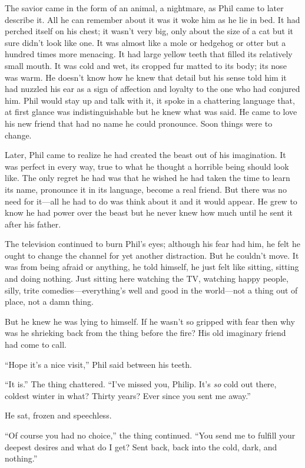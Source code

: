 \documentclass[
]{article}
\begin{document}
The savior came in the form of an animal, a nightmare, as Phil came to
later describe it. All he can remember about it was it woke him as he
lie in bed. It had perched itself on his chest; it wasn't very big, only
about the size of a cat but it sure didn't look like one. It was almost
like a mole or hedgehog or otter but a hundred times more menacing. It
had large yellow teeth that filled its relatively small mouth. It was
cold and wet, its cropped fur matted to its body; its nose was warm. He
doesn't know how he knew that detail but his sense told him it had
nuzzled his ear as a sign of affection and loyalty to the one who had
conjured him. Phil would stay up and talk with it, it spoke in a
chattering language that, at first glance was indistinguishable but he
knew what was said. He came to love his new friend that had no name he
could pronounce. Soon things were to change.

Later, Phil came to realize he had created the beast out of his
imagination. It was perfect in every way, true to what he thought a
horrible being should look like. The only regret he had was that he
wished he had taken the time to learn its name, pronounce it in its
language, become a real friend. But there was no need for it---all he
had to do was think about it and it would appear. He grew to know he had
power over the beast but he never knew how much until he sent it after
his father.

The television continued to burn Phil's eyes; although his fear had him,
he felt he ought to change the channel for yet another distraction. But
he couldn't move. It was from being afraid or anything, he told himself,
he just felt like sitting, sitting and doing nothing. Just sitting here
watching the TV, watching happy people, silly, trite
comedies---everything's well and good in the world---not a thing out of
place, not a damn thing.

But he knew he was lying to himself. If he wasn't so gripped with fear
then why was he shrieking back from the thing before the fire? His old
imaginary friend had come to call.

``Hope it's a nice visit,'' Phil said between his teeth.

``It is.'' The thing chattered. ``I've missed you, Philip. It's
\emph{so} cold out there, coldest winter in what? Thirty years? Ever
since you sent me away.''

He sat, frozen and speechless.

``Of course you had no choice,'' the thing continued. ``You send me to
fulfill your deepest desires and what do I get? Sent back, back into the
cold, dark, and nothing.''
\end{document}
